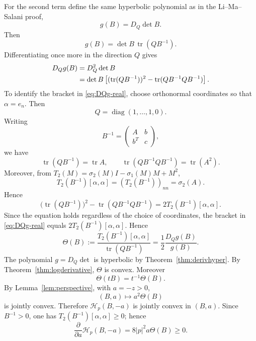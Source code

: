 \documentclass{article}
\newcommand{\tr}{\operatorname{tr}}
\numberwithin{equation}{section}
\begin{document}
For the second term define the same hyperbolic polynomial as in the Li--Ma--Salani proof,
\begin{equation}\label{eq:g-real-second}
g(B)=D_Q\det B.
\end{equation}
Then
\begin{equation}\label{eq:g-real-first-id}
g(B)=\det B\,\tr(QB^{-1}).
\end{equation}
Differentiating once more in the direction $Q$ gives
\begin{align}
D_Qg(B)
&=D_Q^2\det B
\notag\\
&=\det B\left[(\tr(QB^{-1}))^2-\tr(QB^{-1}QB^{-1})\right].
\label{eq:DQg-real}
\end{align}
To identify the bracket in \eqref{eq:DQg-real}, choose orthonormal
coordinates so that $\alpha=e_n$. Then
\[
Q=\operatorname{diag}(1,\ldots,1,0).
\]
Writing
\[
B^{-1}=
\begin{pmatrix}
A & b\\
b^T & c
\end{pmatrix},
\]
we have
\[
\operatorname{tr}(QB^{-1})=\operatorname{tr}A,
\qquad
\operatorname{tr}(QB^{-1}QB^{-1})=\operatorname{tr}(A^2).
\]
Moreover, from
$T_2(M)=\sigma_2(M)I-\sigma_1(M)M+M^2$,
\[
T_2(B^{-1})[\alpha,\alpha]
=(T_2(B^{-1}))_{nn}
=\sigma_2(A).
\]
Hence
\[
\bigl(\operatorname{tr}(QB^{-1})\bigr)^2
-\operatorname{tr}(QB^{-1}QB^{-1})
=2T_2(B^{-1})[\alpha,\alpha].
\]
Since the equation holds regardless of the choice of coordinates, the bracket in \eqref{eq:DQg-real} equals $2T_2(B^{-1})[\alpha,\alpha]$. Hence
\begin{equation}\label{eq:Theta-real}
\Theta(B):=
\frac{T_2(B^{-1})[\alpha,\alpha]}{\tr(QB^{-1})}
=\frac12\frac{D_Qg(B)}{g(B)}.
\end{equation}
The polynomial $g=D_Q\det$ is hyperbolic by Theorem~\ref{thm:derivhyper}. By Theorem~\ref{thm:logderivative}, $\Theta$ is convex. Moreover
\begin{equation}\label{eq:Theta-real-hom}
\Theta(tB)=t^{-1}\Theta(B).
\end{equation}
By Lemma~\ref{lem:perspective}, with $a=-z>0$,
\[
(B,a)\longmapsto a^2\Theta(B)
\]
is jointly convex. Therefore $\mathcal H_p(B,-a)$ is jointly convex in $(B,a)$. Since $B^{-1}>0$, one has $T_2(B^{-1})[\alpha,\alpha]\ge0$; hence
\begin{equation}\label{eq:Hreal-monotone}
\frac{\partial}{\partial a}\mathcal H_p(B,-a)
=8|p|^2a\Theta(B)\ge0.
\end{equation}
\end{document}
